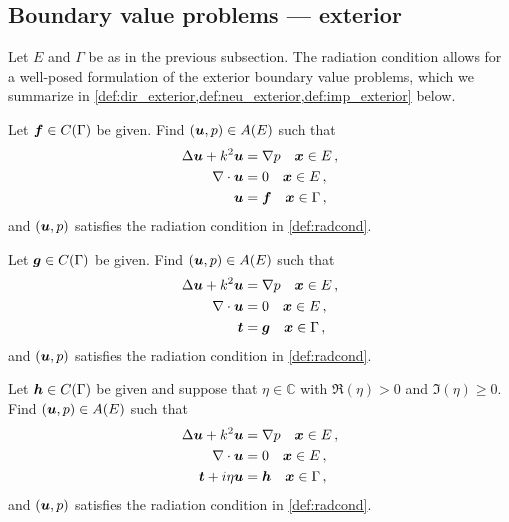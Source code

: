 \subsection{Boundary value problems --- exterior}

Let $E$ and $\Gamma$ be as in the previous subsection.
The radiation condition allows for a well-posed formulation
of the exterior boundary value problems, which we
summarize in
\cref{def:dir_exterior,def:neu_exterior,def:imp_exterior} below.

\begin{definition}
  \label{def:dir_exterior}
  Let ${\boldsymbol f} \in C(\Gamma)$ be given. Find $({\boldsymbol u},p) \in A(E)$
  such that
  \begin{equation}
  \begin{aligned} \label{eq:dir_exterior}
    \Delta {\boldsymbol u} + k^{2} {\boldsymbol u} &= \nabla p \quad {\boldsymbol x} \in E \, ,\\
    \nabla \cdot {\boldsymbol u} &= 0 \quad {\boldsymbol x} \in E \, ,  \\
    {\boldsymbol u} &= {\boldsymbol f} \quad {\boldsymbol x} \in \Gamma \, , 
  \end{aligned}
  \end{equation}
  and $({\boldsymbol u},p)$ satisfies the radiation condition in
  \cref{def:radcond}.
\end{definition}
\begin{definition}
  \label{def:neu_exterior}  
  Let ${\boldsymbol g} \in C(\Gamma)$ be given. Find $({\boldsymbol u},p) \in A(E)$
  such that
  \begin{equation}
  \begin{aligned} \label{eq:neu_exterior}
    \Delta {\boldsymbol u} + k^{2} {\boldsymbol u} &= \nabla p \quad {\boldsymbol x} \in E \, ,\\
    \nabla \cdot {\boldsymbol u} &= 0 \quad {\boldsymbol x} \in E \, ,  \\
    {\boldsymbol t} &= {\boldsymbol g} \quad {\boldsymbol x} \in \Gamma \, ,
  \end{aligned}
  \end{equation}
  and $({\boldsymbol u},p)$ satisfies the radiation condition in
  \cref{def:radcond}.
\end{definition}

\begin{definition}
  \label{def:imp_exterior}  
  Let ${\boldsymbol h} \in C(\Gamma)$ be given and suppose that
  $\eta \in \mathbb{C}$ with $\Re{(\eta)} > 0$ and $\Im{(\eta)} \ge 0$. 
  Find $({\boldsymbol u},p) \in A(E)$
  such that
  \begin{equation}
  \begin{aligned} \label{eq:imp_exterior}
    \Delta {\boldsymbol u} + k^{2} {\boldsymbol u} &= \nabla p \quad {\boldsymbol x} \in E \, ,\\
    \nabla \cdot {\boldsymbol u} &= 0 \quad {\boldsymbol x} \in E \, ,  \\
    {\boldsymbol t} + i\eta {\boldsymbol u} &= {\boldsymbol h} \quad {\boldsymbol x} \in \Gamma \, ,
  \end{aligned}
  \end{equation}
  and $({\boldsymbol u},p)$ satisfies the radiation condition in
  \cref{def:radcond}.
\end{definition}


